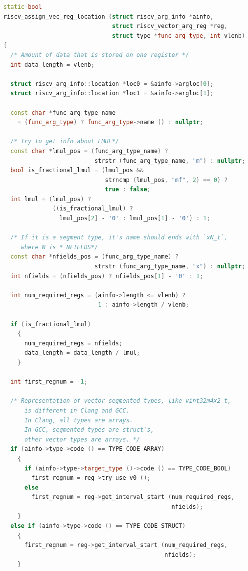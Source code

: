 \begin{samepage}
\begin{lstlisting}[language=C++, caption=Функция для выбора набора регистров для передачи аргумента, 
			   label=lst:func:riscv_assign_vec_reg_location, breaklines=false]
static bool
riscv_assign_vec_reg_location (struct riscv_arg_info *ainfo,
                               struct riscv_vector_arg_reg *reg,
                               struct type *func_arg_type, int vlenb)
{
  /* Amount of data that is stored on one register */
  int data_length = vlenb;   
  
  struct riscv_arg_info::location *loc0 = &ainfo->argloc[0];
  struct riscv_arg_info::location *loc1 = &ainfo->argloc[1];
   
  const char *func_arg_type_name
    = (func_arg_type) ? func_arg_type->name () : nullptr;
   
  /* Try to get info about LMUL*/
  const char *lmul_pos = (func_arg_type_name) ? 
                          strstr (func_arg_type_name, "m") : nullptr;
  bool is_fractional_lmul = (lmul_pos && 
                             strncmp (lmul_pos, "mf", 2) == 0) ? 
                             true : false;
  int lmul = (lmul_pos) ? 
              ((is_fractional_lmul) ? 
                lmul_pos[2] - '0' : lmul_pos[1] - '0') : 1;
   
  /* If it is a segment type, it's name should ends with `xN_t`, 
     where N is * NFIELDS*/
  const char *nfields_pos = (func_arg_type_name) ? 
                          strstr (func_arg_type_name, "x") : nullptr;
  int nfields = (nfields_pos) ? nfields_pos[1] - '0' : 1;
   
  int num_required_regs = (ainfo->length <= vlenb) ? 
                           1 : ainfo->length / vlenb;
   
  if (is_fractional_lmul)
    {
      num_required_regs = nfields;
      data_length = data_length / lmul;
    }
   
  int first_regnum = -1;
   
  /* Representation of vector segmented types, like vint32m4x2_t,
      is different in Clang and GCC.
      In Clang, all types are arrays.
      In GCC, segmented types are struct's, 
      other vector types are arrays. */
  if (ainfo->type->code () == TYPE_CODE_ARRAY)
    {
      if (ainfo->type->target_type ()->code () == TYPE_CODE_BOOL)
        first_regnum = reg->try_use_v0 ();
      else
        first_regnum = reg->get_interval_start (num_required_regs, 
                                                nfields);
    }
  else if (ainfo->type->code () == TYPE_CODE_STRUCT)
    {
      first_regnum = reg->get_interval_start (num_required_regs, 
                                              nfields);
    }
   

\end{lstlisting}
\end{samepage}
